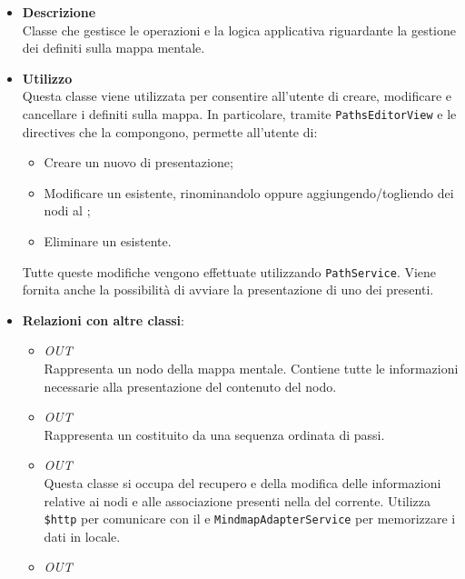 \begin{itemize}
\item \textbf{Descrizione}\\
Classe che gestisce le operazioni e la logica applicativa riguardante la gestione dei  definiti sulla mappa mentale.
\item \textbf{Utilizzo}\\
Questa classe viene utilizzata per consentire all’utente di creare, modificare e cancellare i  definiti sulla mappa. In particolare, tramite \texttt{PathsEditorView} e le directives che la compongono, permette all’utente di:
\begin{itemize}
\item Creare un nuovo  di presentazione;
\item Modificare un  esistente, rinominandolo oppure aggiungendo/togliendo dei nodi al ;
\item Eliminare un  esistente.
\end{itemize}
Tutte queste modifiche vengono effettuate utilizzando \texttt{PathService}.
Viene fornita anche la possibilità di avviare la presentazione di uno dei  presenti.
\item \textbf{Relazioni con altre classi}:
\begin{itemize}
\item \textit{OUT} \hyperref[\nogloxy{Premi::Front-End::Model::Node}]{}\\
Rappresenta un nodo della mappa mentale. Contiene tutte le informazioni necessarie alla presentazione del contenuto del nodo.
\item \textit{OUT} \hyperref[\nogloxy{Premi::Front-End::Model::Path}]{}\\
Rappresenta un  costituito da una sequenza ordinata di passi.
\item \textit{OUT} \hyperref[\nogloxy{Premi::Front-End::Services::MindmapService}]{}\\
Questa classe si occupa del recupero e della modifica delle informazioni relative ai nodi e alle associazione presenti nella  del  corrente. Utilizza \texttt{\$http} per comunicare con il  e \texttt{MindmapAdapterService} per memorizzare i dati in locale.
\item \textit{OUT} \hyperref[\nogloxy{Premi::Front-End::Services::PathService}]{}\\

\end{itemize}
\end{itemize}
